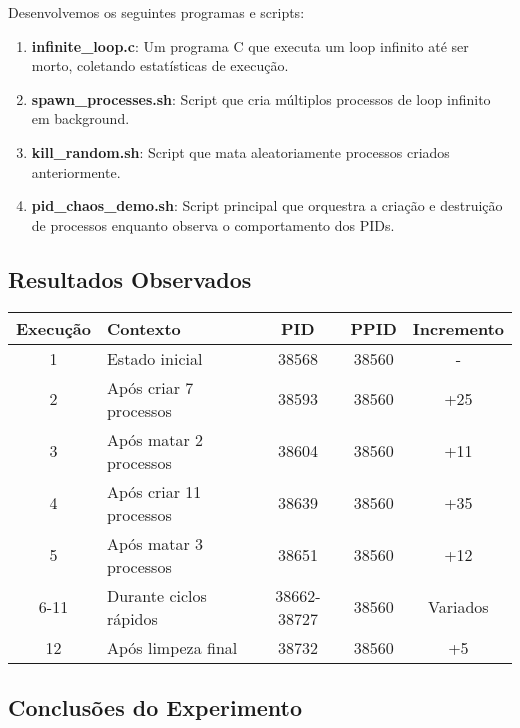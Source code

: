 \documentclass[a4paper,11pt]{article}
\begin{document}
Desenvolvemos os seguintes programas e scripts:

\begin{enumerate}
    \item \textbf{infinite\_loop.c}: Um programa C que executa um loop infinito até ser morto, coletando estatísticas de execução.
    \item \textbf{spawn\_processes.sh}: Script que cria múltiplos processos de loop infinito em background.
    \item \textbf{kill\_random.sh}: Script que mata aleatoriamente processos criados anteriormente.
    \item \textbf{pid\_chaos\_demo.sh}: Script principal que orquestra a criação e destruição de processos enquanto observa o comportamento dos PIDs.
\end{enumerate}

\subsection{Resultados Observados}

\begin{center}
\begin{tabular}{|c|l|c|c|c|}
\hline
\textbf{Execução} & \textbf{Contexto} & \textbf{PID} & \textbf{PPID} & \textbf{Incremento} \\
\hline
1 & Estado inicial & 38568 & 38560 & - \\
\hline
2 & Após criar 7 processos & 38593 & 38560 & +25 \\
\hline
3 & Após matar 2 processos & 38604 & 38560 & +11 \\
\hline
4 & Após criar 11 processos & 38639 & 38560 & +35 \\
\hline
5 & Após matar 3 processos & 38651 & 38560 & +12 \\
\hline
6-11 & Durante ciclos rápidos & 38662-38727 & 38560 & Variados \\
\hline
12 & Após limpeza final & 38732 & 38560 & +5 \\
\hline
\end{tabular}
\end{center}

\subsection{Conclusões do Experimento}
\end{document}
